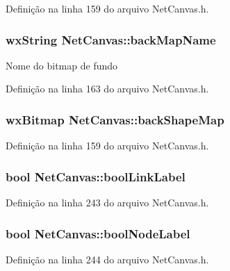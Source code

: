 Definição na linha 159 do arquivo Net\+Canvas.\+h.

\subsubsection[{back\+Map\+Name}]{\setlength{\rightskip}{0pt plus 5cm}wx\+String Net\+Canvas\+::back\+Map\+Name}\label{class_net_canvas_a50d596d6ecd46f1ecbedcadb29e70532}
Nome do bitmap de fundo 

Definição na linha 163 do arquivo Net\+Canvas.\+h.

\subsubsection[{back\+Shape\+Map}]{\setlength{\rightskip}{0pt plus 5cm}wx\+Bitmap Net\+Canvas\+::back\+Shape\+Map}\label{class_net_canvas_a6aa87e9712b3d6e510946eff6f1de098}


Definição na linha 159 do arquivo Net\+Canvas.\+h.

\subsubsection[{bool\+Link\+Label}]{\setlength{\rightskip}{0pt plus 5cm}bool Net\+Canvas\+::bool\+Link\+Label}\label{class_net_canvas_ac1f9cd6274ec6f23e0e423f1b8577102}


Definição na linha 243 do arquivo Net\+Canvas.\+h.

\subsubsection[{bool\+Node\+Label}]{\setlength{\rightskip}{0pt plus 5cm}bool Net\+Canvas\+::bool\+Node\+Label}\label{class_net_canvas_af714e758654edc37d3b4c394516e61c2}


Definição na linha 244 do arquivo Net\+Canvas.\+h.

